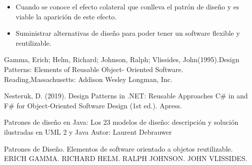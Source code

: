 \documentclass[twoside,twocolumn]{article}
\begin{document}
\begin{itemize}
\item Cuando se conoce el efecto colateral que conlleva el patrón de diseño y es viable la aparición de este efecto.
\item Suministrar alternativas de diseño para poder tener un software flexible y reutilizable.

\end{itemize}




\begin{thebibliography}{99} 

\bibitem[1]{}
\newblock Gamma, Erich; Helm, Richard; Johnson, Ralph; Vlissides, John(1995).Design Patterns: Elements of Reusable Object- Oriented Software. Reading,Massachusetts: Addison Wesley Longman, Inc.

\bibitem[2]{}
\newblock Nesteruk, D. (2019). Design Patterns in .NET: Reusable Approaches C\# in and F\# for Object-Oriented Software Design (1st ed.). Apress.

\bibitem[3]{}
\newblock Patrones de diseño en Java: Los 23 modelos de diseño: descripción y solución ilustradas en UML 2 y Java Autor: Laurent Debrauwer

\bibitem[4]{}
\newblock Patrones de Diseño. Elementos de software orientado a objetos reutilizable. ERICH GAMMA. RICHARD HELM. RALPH JOHNSON. JOHN VLISSIDES.

\end{thebibliography}


\end{document}
